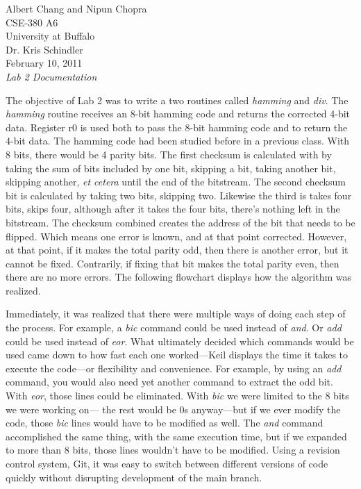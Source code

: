 \documentclass[letterpaper,10pt]{article}
\begin{document}
    Albert Chang and Nipun Chopra\\
    CSE-380 A6\\
    University at Buffalo\\
    Dr. Kris Schindler\\
    February 10, 2011\\
    \textit{Lab 2 Documentation}

    The objective of Lab 2 was to write a two routines called \textit{hamming}
    and \textit{div}. The \textit{hamming} routine receives an 8-bit hamming
    code and returns the corrected 4-bit data. Register r0 is used both to
    pass the 8-bit hamming code and to return the 4-bit data. The hamming
    code had been studied before in a previous class. With 8 bits, there would
    be 4 parity bits. The first checksum is calculated with by taking the
    sum of bits included by one bit, skipping a bit, taking another bit,
    skipping another, \textit{et cetera} until the end of the bitstream. The
    second checksum bit is calculated by taking two bits, skipping two.
    Likewise the third is takes four bits, skips four, although after it takes
    the four bits, there's nothing left in the bitstream. The checksum combined
    creates the address of the bit that needs to be flipped. Which means one
    error is known, and at that point corrected. However, at that point, if
    it makes the total parity odd, then there is another error, but it cannot
    be fixed. Contrarily, if fixing that bit makes the total parity even, then
    there are no more errors. The following flowchart displays how the
    algorithm was realized.

    Immediately, it was realized that there were multiple ways of doing each
    step of the process. For example, a \textit{bic} command could be used
    instead of \textit{and}. Or \textit{add} could be used instead of
    \textit{eor}. What ultimately decided which commands would be used came
    down to how fast each one worked---Keil displays the time it takes to
    execute the code---or flexibility and convenience. For example, by
    using an \textit{add} command, you would also need yet another command to
    extract the odd bit. With \textit{eor}, those lines could be eliminated.
    With \textit{bic} we were limited to the 8 bits we were working on---
    the rest would be 0s anyway---but if we ever modify the code, those
    \textit{bic} lines would have to be modified as well. The \textit{and}
    command accomplished the same thing, with the same execution time, but if
    we expanded to more than 8 bits, those lines wouldn't have to be modified.
    Using a revision control system, Git, it was easy to switch between
    different versions of code quickly without disrupting development of the
    main branch.
\end{document}
